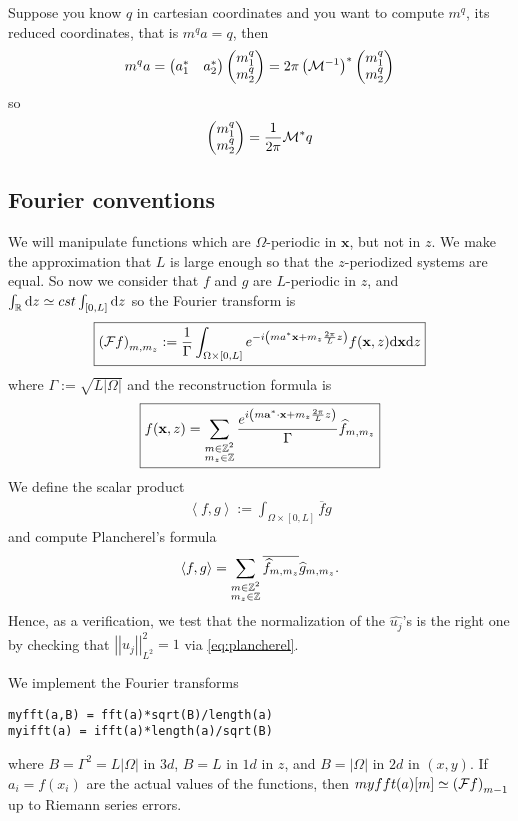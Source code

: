 \documentclass[11pt,a4paper,reqno,french,tikz]{amsart}
\def\d{{\rm d}}
\newcommand{\pa}[1]{\left( #1 \right)} %
\newcommand{\ab}[1]{\left|#1\right|} %
\newcommand{\ps}[1]{\left< #1 \right>} %
\newcommand{\nor}[2]{ \left| \! \left| #1 \right| \! \right|_{#2} } %
\newcommand{\f}[2]{\frac{#1}{#2}} %
\newcommand{\mat}[1]{\begin{pmatrix} #1 \end{pmatrix}} %
\def\ba{{\mathbf a}}
\def\bx{{\mathbf x}}
\begin{document}
Suppose you know $q$ in cartesian coordinates and you want to compute $m^q$, its reduced coordinates, that is $m^q a = q$, then
\begin{align*}
	m^q a = \mat{a_1^* & a_2^*} \mat{m^q_1 \\ m^q_2} = 2\pi \pa{\cM^{-1}}^* \mat{m^q_1 \\ m^q_2}
\end{align*}
so
\begin{align}\label{eq:inv_q}
\mat{m^q_1 \\ m^q_2} = \f{1}{2\pi} \cM^* q
\end{align}

\subsection{Fourier conventions}%
\label{sub:fourier_conventions}

We will manipulate functions which are $\Omega$-periodic in $\bx$, but not in $z$. We make the approximation that $L$ is large enough so that the $z$-periodized systems are equal. So now we consider that $f$ and $g$ are $L$-periodic in $z$, and $\int_\R \d z \simeq cst \int_{[0,L]} \d z$ so the Fourier transform is
\begin{align*}
	\boxed{\pa{\cF f}_{m,m_z} := \f{1}{\Gamma} \int_{\Omega\times [0,L]} e^{-i\pa{ma^* \bx + m_z \f{2\pi}{L} z}} f(\bx,z) \d \bx \d z}
\end{align*}
where $\Gamma := \sqrt{L\ab{\Omega}}$
and the reconstruction formula is
\begin{align}\label{eq:dec_four}
\boxed{f(\bx,z) =  \sum_{\substack{m \in \Z^2 \\ m_z \in \Z}}  \f{e^{i\pa{m \ba^* \cdot \bx + m_z \f{2\pi}L z}}}{\Gamma} \widehat{f}_{m,m_z}}
\end{align}
We define the scalar product
\begin{align*}
\ps{f,g} := \int_{\Omega\times [0,L]} \overline{f}g
\end{align*}
and compute Plancherel's formula
\begin{align}\label{eq:plancherel}
\ps{f,g} = \sum_{\substack{m \in \Z^2 \\ m_z \in \Z}} \overline{\widehat{f}_{m,m_z}} \widehat{g}_{m,m_z}.
\end{align}
Hence, as a verification, we test that the normalization of the $\widehat{u_j}$'s is the right one by checking that $\nor{u_j}{L^2}^2 = 1$ via \eqref{eq:plancherel}.

We implement the Fourier transforms
\begin{lstlisting}
myfft(a,B) = fft(a)*sqrt(B)/length(a)
myifft(a) = ifft(a)*length(a)/sqrt(B)
\end{lstlisting}
where $B = \Gamma^2 = L \ab{\Omega}$ in $3d$, $B = L$ in $1d$ in $z$, and $B=\ab{\Omega}$ in $2d$ in $(x,y)$. If $a_i = f(x_i)$ are the actual values of the functions, then $myfft(a)[m] \simeq \pa{\cF f}_{m-1}$ up to Riemann series errors.
\end{document}
